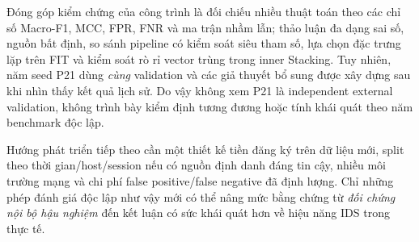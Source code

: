 Đóng góp kiểm chứng của công trình là đối chiếu nhiều thuật toán theo các chỉ số Macro-F1, MCC, FPR, FNR và ma trận nhầm lẫn; thảo luận đa dạng sai số, nguồn bất định, so sánh pipeline có kiểm soát siêu tham số, lựa chọn đặc trưng lặp trên FIT và kiểm soát rò rỉ vector trùng trong inner Stacking. Tuy nhiên, năm seed P21 dùng \emph{cùng} validation và các giả thuyết bổ sung được xây dựng sau khi nhìn thấy kết quả lịch sử. Do vậy không xem P21 là independent external validation, không trình bày kiểm định tương đương hoặc tính khái quát theo năm benchmark độc lập.

Hướng phát triển tiếp theo cần một thiết kế tiền đăng ký trên dữ liệu mới, split theo thời gian/host/session nếu có nguồn định danh đáng tin cậy, nhiều môi trường mạng và chi phí false positive/false negative đã định lượng. Chỉ những phép đánh giá độc lập như vậy mới có thể nâng mức bằng chứng từ \emph{đối chứng nội bộ hậu nghiệm} đến kết luận có sức khái quát hơn về hiệu năng IDS trong thực tế.
